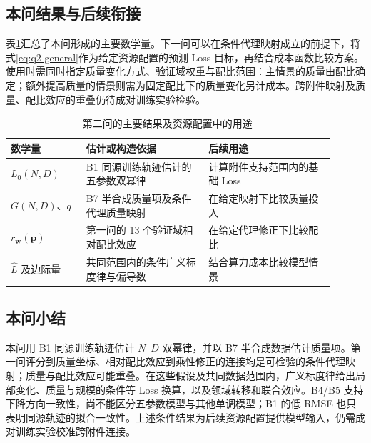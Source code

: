 \subsection{本问结果与后续衔接}

表\ref{tab:q2-output}汇总了本问形成的主要数学量。下一问可以在条件代理映射成立的前提下，将式\eqref{eq:q2-general}作为给定资源配置的预测 Loss 目标，再结合成本函数比较方案。使用时需同时指定质量变化方式、验证域权重与配比范围：主情景的质量由配比确定；额外提高质量的情景则需为固定配比下的质量变化另计成本。跨附件映射及质量、配比效应的重叠仍待成对训练实验检验。

\begin{table}[htbp]
 \centering\small
 \caption{第二问的主要结果及资源配置中的用途}
 \label{tab:q2-output}
 \begin{tabular}{p{0.21\linewidth}p{0.34\linewidth}p{0.35\linewidth}}
 \toprule
 数学量 & 估计或构造依据 & 后续用途\\
 \midrule
 $L_0(N,D)$ & B1 同源训练轨迹估计的五参数双幂律 & 计算附件支持范围内的基础 Loss\\
 $G(N,D)$、$q$ & B7 半合成质量项及条件代理质量映射 & 在给定映射下比较质量投入\\
 $r_{\boldsymbol w}(\boldsymbol p)$ & 第一问的 13 个验证域相对配比效应 & 在给定代理修正下比较配比\\
 $\widehat L$ 及边际量 & 共同范围内的条件广义标度律与偏导数 & 结合算力成本比较模型情景\\
 \bottomrule
 \end{tabular}
\end{table}

\subsection{本问小结}

本问用 B1 同源训练轨迹估计 $N$--$D$ 双幂律，并以 B7 半合成数据估计质量项。第一问评分到质量坐标、相对配比效应到乘性修正的连接均是可检验的条件代理映射；质量与配比效应可能重叠。在这些假设及共同数据范围内，广义标度律给出局部变化、质量与规模的条件等 Loss 换算，以及领域转移和联合效应。B4/B5 支持下降方向一致性，尚不能区分五参数模型与其他单调模型；B1 的低 RMSE 也只表明同源轨迹的拟合一致性。上述条件结果为后续资源配置提供模型输入，仍需成对训练实验校准跨附件连接。
